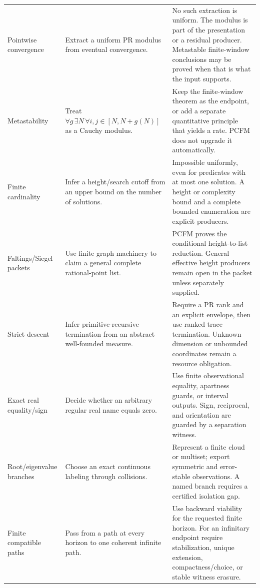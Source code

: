 \begin{longtable}{p{}p{}p{}}
Pointwise convergence &
Extract a uniform PR modulus from eventual convergence. &
No such extraction is uniform.  The modulus is part of the presentation or a
residual producer.  Metastable finite-window conclusions may be proved when
that is what the input supports.\\

Metastability &
Treat \(\forall g\,\exists N\,\forall i,j\in[N,N+g(N)]\) as a Cauchy modulus. &
Keep the finite-window theorem as the endpoint, or add a separate quantitative
principle that yields a rate.  PCFM does not upgrade it automatically.\\

Finite cardinality &
Infer a height/search cutoff from an upper bound on the number of solutions. &
Impossible uniformly, even for predicates with at most one solution.  A height
or complexity bound and a complete bounded enumeration are explicit
producers.\\

Faltings/Siegel packets &
Use finite graph machinery to claim a general complete rational-point list. &
PCFM proves the conditional height-to-list reduction.  General effective
height producers remain open in the packet unless separately supplied.\\

Strict descent &
Infer primitive-recursive termination from an abstract well-founded measure. &
Require a PR rank and an explicit envelope, then use ranked trace termination.
Unknown dimension or unbounded coordinates remain a resource obligation.\\

Exact real equality/sign &
Decide whether an arbitrary regular real name equals zero. &
Use finite observational equality, apartness guards, or interval outputs.
Sign, reciprocal, and orientation are guarded by a separation witness.\\

Root/eigenvalue branches &
Choose an exact continuous labeling through collisions. &
Represent a finite cloud or multiset; export symmetric and error-stable
observations.  A named branch requires a certified isolation gap.\\

Finite compatible paths &
Pass from a path at every horizon to one coherent infinite path. &
Use backward viability for the requested finite horizon.  For an infinitary
endpoint require stabilization, unique extension, compactness/choice, or
stable witness erasure.\\


\end{longtable}
